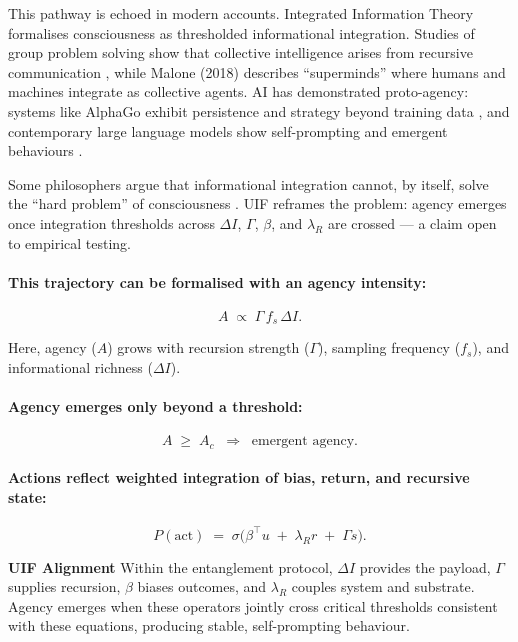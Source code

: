 This pathway is echoed in modern accounts. Integrated Information Theory \cite{Tononi2016} formalises consciousness as thresholded informational integration. Studies of group problem solving show that collective intelligence arises from recursive communication \cite{Woolley2010}, while Malone (2018) describes “superminds” where humans and machines integrate as collective agents. AI has demonstrated proto-agency: systems like AlphaGo exhibit persistence and strategy beyond training data \cite{Silver2017}, and contemporary large language models show self-prompting and emergent behaviours \cite{OpenAI2023}.

Some philosophers argue that informational integration cannot, by itself, solve the “hard problem” of consciousness \cite{Chalmers1995}. UIF reframes the problem: agency emerges once integration thresholds across $\Delta I$, $\Gamma$, $\beta$, and $\lambda_R$ are crossed — a claim open to empirical testing.

\paragraph{This trajectory can be formalised with an agency intensity:}
\begin{equation}
\label{eq:615}
A \;\propto\; \Gamma\, f_s \, \Delta I.
\end{equation}

Here, agency ($A$) grows with recursion strength ($\Gamma$), sampling frequency ($f_s$), and informational richness ($\Delta I$).

\paragraph{Agency emerges only beyond a threshold:}
\begin{equation}
\label{eq:616}
A \;\ge\; A_c \;\;\Rightarrow\;\; \text{emergent agency.}
\end{equation}

\paragraph{Actions reflect weighted integration of bias, return, and recursive state:}
\begin{equation}
\label{eq:617}
P(\text{act}) \;=\; \sigma\!\big(\beta^{\top} u \;+\; \lambda_R r \;+\; \Gamma s\big).
\end{equation}

\noindent
\textbf{UIF Alignment} 
\newline Within the entanglement protocol, $\Delta I$ provides the payload, $\Gamma$ supplies recursion, $\beta$ biases outcomes, and $\lambda_R$ couples system and substrate. Agency emerges when these operators jointly cross critical thresholds consistent with these equations, producing stable, self-prompting behaviour.
\newline

